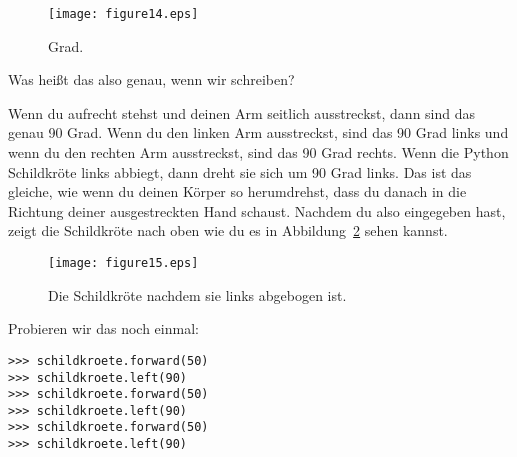 \begin{figure}
\begin{center}
\texttt{[image: figure14.eps]}
\end{center}
\caption{Grad.}\label{fig14}
\end{figure}


Was heißt das also genau, wenn wir  schreiben?
\par
Wenn du aufrecht stehst und deinen Arm seitlich ausstreckst, dann sind das genau 90 Grad. Wenn du den linken Arm ausstreckst, sind das 90 Grad links und wenn du den rechten Arm ausstreckst, sind das 90 Grad rechts. Wenn die Python Schildkröte links abbiegt, dann dreht sie sich um 90 Grad links. Das ist das gleiche, wie wenn du deinen Körper so herumdrehst, dass du danach in die Richtung deiner ausgestreckten Hand schaust. Nachdem du also  eingegeben hast, zeigt die Schildkröte nach oben wie du es in Abbildung~\ref{fig15} sehen kannst.

\begin{figure}
\begin{center}
\texttt{[image: figure15.eps]}
\end{center}
\caption{Die Schildkröte nachdem sie links abgebogen ist.}\label{fig15}
\end{figure}

Probieren wir das noch einmal:

\begin{listing}
\begin{verbatim}
>>> schildkroete.forward(50)
>>> schildkroete.left(90)
>>> schildkroete.forward(50)
>>> schildkroete.left(90)
>>> schildkroete.forward(50)
>>> schildkroete.left(90)
\end{verbatim}
\end{listing}


